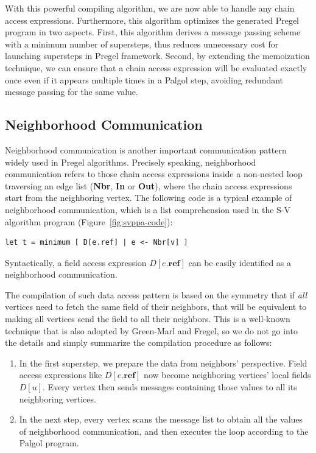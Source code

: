 \documentclass{sokendai_thesis} %
\begin{document}
With this powerful compiling algorithm, we are now able to handle any chain access expressions.
Furthermore, this algorithm optimizes the generated Pregel program in two aspects.
First, this algorithm derives a message passing scheme with a minimum number of supersteps, thus reduces unnecessary cost for launching supersteps in Pregel framework.
Second, by extending the memoization technique, we can ensure that a chain access expression will be evaluated exactly once even if it appears multiple times in a Palgol step, avoiding redundant message passing for the same value.


\subsection{Neighborhood Communication}
\label{sec:neighboring-access}

Neighborhood communication is another important communication pattern widely used in Pregel algorithms.
Precisely speaking, neighborhood communication refers to those chain access expressions inside a non-nested loop traversing an edge list (\textbf{Nbr}, \textbf{In} or \textbf{Out}), where the chain access expressions start from the neighboring vertex.
The following code is a typical example of neighborhood communication, which is a list comprehension used in the S-V algorithm program (Figure~\ref{fig:svppa-code}):
\begin{lstlisting}[basicstyle=\small\ttfamily,firstnumber=7]
    let t = minimum [ D[e.ref] | e <- Nbr[v] ]
\end{lstlisting}
Syntactically, a field access expression $D[e.\mathbf{ref}]$ can be easily identified as a neighborhood communication.

The compilation of such data access pattern is based on the symmetry that if \emph{all} vertices need to fetch the same field of their neighbors, that will be equivalent to making all vertices send the field to all their neighbors.
This is a well-known technique that is also adopted by Green-Marl and Fregel, so we do not go into the details and simply summarize the compilation procedure as follows:
\begin{enumerate}
 \item In the first superstep, we prepare the data from neighbors' perspective.
  Field access expressions like $D[e.\mathbf{ref}]$ now become neighboring vertices' local fields $D[u]$.
  Every vertex then sends messages containing those values to all its neighboring vertices.
 \item In the next step, every vertex scans the message list to obtain all the values of neighborhood communication, and then executes the loop according to the Palgol program.
\end{enumerate}
\end{document}

